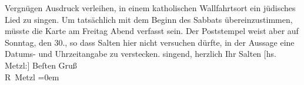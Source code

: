 \begin{ledgroupsized}[t]{13cm}
{{{                  Vergnügen Ausdruck verleihen, in einem katholischen Wallfahrtsort ein jüdisches Lied 
                  zu singen. Um tatsächlich mit dem Beginn des Sabbats übereinzustimmen, müsste die Karte
                  am Freitag Abend verfasst sein. Der Poststempel
                  weist aber auf Sonntag, den 30., so dass Salten hier
                  nicht versuchen dürfte, in der Aussage eine Datums- und Uhrzeitangabe zu verstecken.}}}\label{K_L03410-2h}
                  singend,
            \pend
           \pstart herzlich Ihr \spacefill\mbox{Salten}\pend{}\pstart
           {[}hs. Metzl:{]} Beſten Gruß {\\[\baselineskip]}\spacefill\mbox{R Metzl}\pend
           \leftskip=0em{}
         
         \endnumbering{}\end{ledgroupsized}  \newcommand{\dateiname}{L03410}\newcommand{\titel}{Felix Salten und Richard Metzl an Arthur Schnitzler, [30. 7. 1905?]}\newcommand{\editorInnen}{Martin Anton Müller und Laura Untner}
      